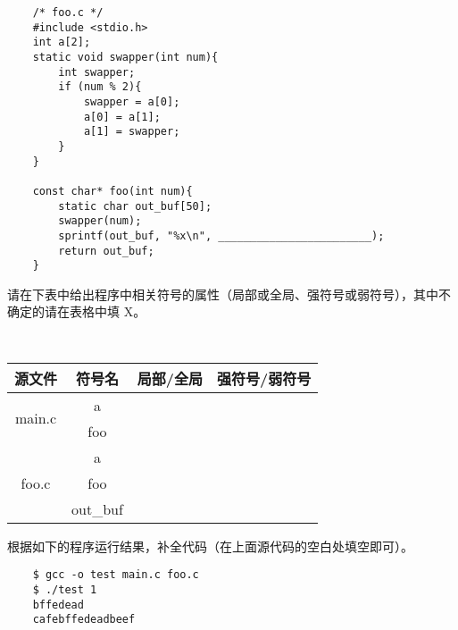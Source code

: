 \begin{problems}
\begin{verbatim}
    /* foo.c */
    #include <stdio.h>
    int a[2];
    static void swapper(int num){
        int swapper;
        if (num % 2){
            swapper = a[0];
            a[0] = a[1];
            a[1] = swapper;
        }
    }

    const char* foo(int num){
        static char out_buf[50];
        swapper(num);
        sprintf(out_buf, "%x\n", ________________________);
        return out_buf;
    }
        \end{verbatim}
        \qn 请在下表中给出程序中相关符号的属性（局部或全局、强符号或弱符号），其中不确定的请在表格中填 X。
        \begin{table}[H]
            \tt
            \centering
            \begin{tabular}{|c|c|c|c|}
                \hline
                源文件 & 符号名 & {\qquad \qquad 局部/全局 \qquad \qquad} & {\qquad \qquad 强符号/弱符号 \qquad \qquad} \\ \hline
                \multirow{2}{*}{main.c} & a &  &  \\ \cline{2-4} 
                & foo &  &  \\ \hline
                \multirow{3}{*}{foo.c} & a &  &  \\ \cline{2-4} 
                & foo &  &  \\ \cline{2-4} 
                & out\_buf &  &  \\ \hline
            \end{tabular}
        \end{table}
        \qn 根据如下的程序运行结果，补全代码（在上面源代码的空白处填空即可）。
        \begin{verbatim}
    $ gcc -o test main.c foo.c
    $ ./test 1
    bffedead
    cafebffedeadbeef
    

\end{verbatim}
\end{problems}
